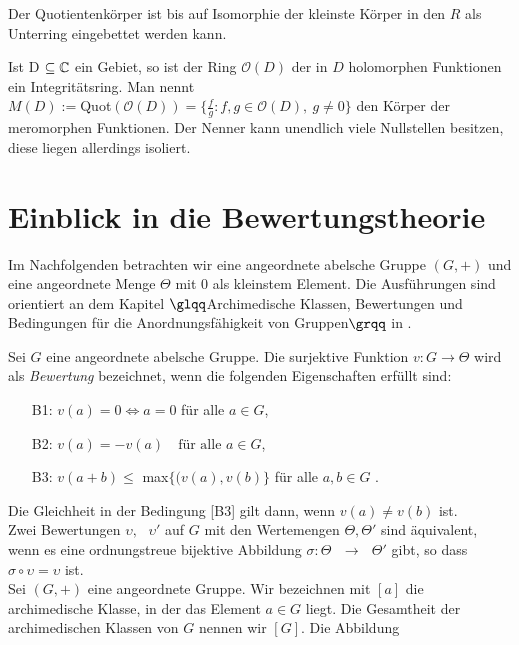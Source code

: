 %
%
% 
%
%
\begin{bem}
Der Quotientenkörper ist bis auf Isomorphie der kleinste Körper in den $R$ als Unterring eingebettet werden kann.
\end{bem}
%
%
%
%
%
%
%
\begin{bsp}
Ist D $\subseteq \mathbb{C}$ ein Gebiet, so ist der Ring $ \mathcal{O} (D) $ der in $D$ holomorphen Funktionen ein Integritätsring. Man nennt \\
$ M \left(D\right) := $Quot$\left( \mathcal{O} \left( D \right)\right) = \lbrace \frac{f}{g}: f,g \in \mathcal{O} (D), ~g \neq 0\rbrace$ den Körper der meromorphen Funktionen. Der Nenner kann unendlich viele Nullstellen besitzen, diese liegen allerdings isoliert. 
\end{bsp}
%
\section{Einblick in die Bewertungstheorie}
Im Nachfolgenden betrachten wir eine angeordnete abelsche Gruppe $\left(G,+\right)$ und eine angeordnete Menge $\Theta$ mit $0$ als kleinstem Element. Die Ausführungen sind orientiert an dem Kapitel $\glqq$Archimedische Klassen, Bewertungen und Bedingungen für die Anordnungsfähigkeit von Gruppen$\grqq$ in \cite[S. 9 - 11]{priesscrampe83}.
%
%
\begin{defn} %
Sei $G$ eine angeordnete abelsche Gruppe. Die surjektive Funktion $v\colon G \rightarrow \Theta$ wird als \textit{Bewertung} bezeichnet, wenn die folgenden Eigenschaften erfüllt sind:
%
\begin{enumerate}
\item[B1:] $v{(a)} = 0 \Leftrightarrow a = 0$ für alle $a\in G$,
\item[B2:]  $v{(a)} = -v{(a)} \text{  } \text{ für alle } a \in G $,
\item[B3:] $ v{(a+ b)} \le$ max$\{(v{(a)}, v{(b)}\}$ für alle $ a, b \in G$ .
\end{enumerate}
%
\end{defn}
Die Gleichheit in der Bedingung [B3] gilt dann, wenn $v{(a)} \ne v{(b)} $ ist.\\
 Zwei Bewertungen $\upsilon, \text{ } \upsilon' $ auf $G$ mit den Wertemengen $\Theta , \Theta' $ sind äquivalent, wenn es eine ordnungstreue bijektive Abbildung $\sigma \colon \Theta \text{ } \rightarrow \text{ } \Theta' $ gibt, so dass $ \sigma \circ \upsilon = \upsilon  $ ist.\\
Sei $\left(G, +\right)$ eine angeordnete Gruppe. Wir bezeichnen mit $[a]$ die archimedische Klasse, in der das Element $a\in G$ liegt. Die Gesamtheit der archimedischen Klassen von $G$ nennen wir $[G]$. Die Abbildung 
